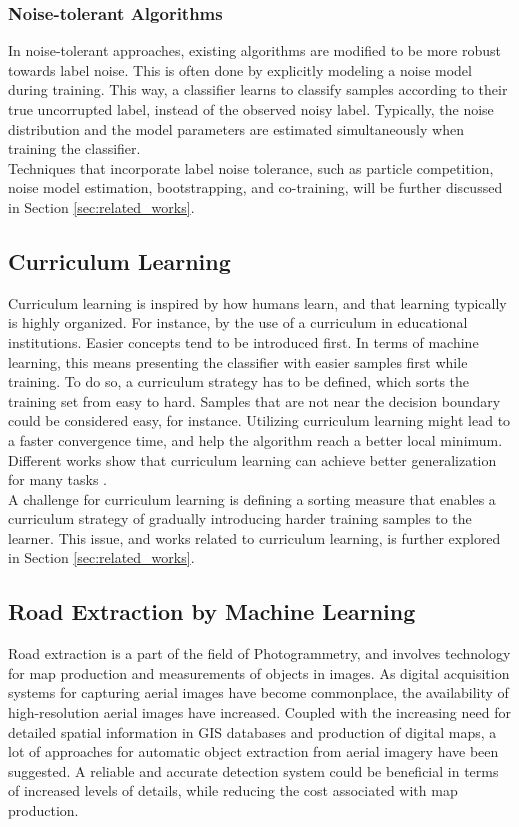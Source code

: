 \subsubsection{Noise-tolerant Algorithms}
In noise-tolerant approaches, existing algorithms are modified to be more robust towards label noise. This is often done by explicitly modeling a noise model during training. This way, a classifier learns to classify samples according to their true uncorrupted label, instead of the observed noisy label. Typically, the noise distribution and the model parameters are estimated simultaneously when training the classifier. \\

Techniques that incorporate label noise tolerance, such as particle competition, noise model estimation, bootstrapping, and co-training, will be further discussed in Section \ref{sec:related_works}.

\subsection{Curriculum Learning}
Curriculum learning is inspired by how humans learn, and that learning typically is highly organized. For instance, by the use of a curriculum in educational institutions. Easier concepts tend to be introduced first. In terms of machine learning, this means presenting the classifier with easier samples first while training. To do so, a curriculum strategy has to be defined, which sorts the training set from easy to hard. Samples that are not near the decision boundary could be considered easy, for instance. Utilizing curriculum learning might lead to a faster convergence time, and help the algorithm reach a better local minimum. Different works show that curriculum learning can achieve better generalization for many tasks \citep{Bengio_curriculumlearning} \citep{Kumar_self_paced_learning} \citep{Lu_self-paced_learning_diversity}.\\

A challenge for curriculum learning is defining a sorting measure that enables a curriculum strategy of gradually introducing harder training samples to the learner. This issue, and works related to curriculum learning, is further explored in Section \ref{sec:related_works}.\\

\subsection{Road Extraction by Machine Learning}
Road extraction is a part of the field of Photogrammetry, and involves technology for map production and measurements of objects in images. As digital acquisition systems for capturing aerial images have become commonplace, the availability of high-resolution aerial images have increased. Coupled with the increasing need for detailed spatial information in \ac{GIS} databases and production of digital maps, a lot of approaches for automatic object extraction from aerial imagery have been suggested. A reliable and accurate detection system could be beneficial in terms of increased levels of details, while reducing the cost associated with map production.\\


